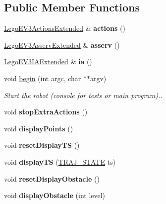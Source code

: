 \subsection*{Public Member Functions}
\begin{DoxyCompactItemize}
\item 
\mbox{\label{classLegoEV3RobotExtended_a70626aafe38f29acbaf2d3ed08018e6c}} 
\hyperlink{classLegoEV3ActionsExtended}{Lego\+E\+V3\+Actions\+Extended} \& {\bfseries actions} ()
\item 
\mbox{\label{classLegoEV3RobotExtended_aa445a8d5e5ca3fd5b1e1f00efefc9c77}} 
\hyperlink{classLegoEV3AsservExtended}{Lego\+E\+V3\+Asserv\+Extended} \& {\bfseries asserv} ()
\item 
\mbox{\label{classLegoEV3RobotExtended_ac3ff45fd243f4cac97ef7f5527c7292f}} 
\hyperlink{classLegoEV3IAExtended}{Lego\+E\+V3\+I\+A\+Extended} \& {\bfseries ia} ()
\item 
\mbox{\label{classLegoEV3RobotExtended_acf15b4325436afc76a9ba1f8b365d0ca}} 
void \hyperlink{classLegoEV3RobotExtended_acf15b4325436afc76a9ba1f8b365d0ca}{begin} (int argc, char $\ast$$\ast$argv)
\begin{DoxyCompactList}\small\item\em Start the robot (console for tests or main program).. \end{DoxyCompactList}\item 
\mbox{\label{classLegoEV3RobotExtended_a27855d5583deb6c1d35b043d9f8b16e3}} 
void {\bfseries stop\+Extra\+Actions} ()
\item 
\mbox{\label{classLegoEV3RobotExtended_aed9f7bb596a950666e603f362c4c845d}} 
void {\bfseries display\+Points} ()
\item 
\mbox{\label{classLegoEV3RobotExtended_a775c4b0ba98ca8643132ccf7b652b30e}} 
void {\bfseries reset\+Display\+TS} ()
\item 
\mbox{\label{classLegoEV3RobotExtended_ae9058c7e6760fd6051a44e2066e4fdf4}} 
void {\bfseries display\+TS} (\hyperlink{path__manager_8h_adb3360abeb29758da93865c8afcb80eb}{T\+R\+A\+J\+\_\+\+S\+T\+A\+TE} ts)
\item 
\mbox{\label{classLegoEV3RobotExtended_a005d29b1c0d8e50ac94972c48e5268f3}} 
void {\bfseries reset\+Display\+Obstacle} ()
\item 
\mbox{\label{classLegoEV3RobotExtended_addd4756be37b6a80e78bb90728d023ec}} 
void {\bfseries display\+Obstacle} (int level)
\end{DoxyCompactItemize}
